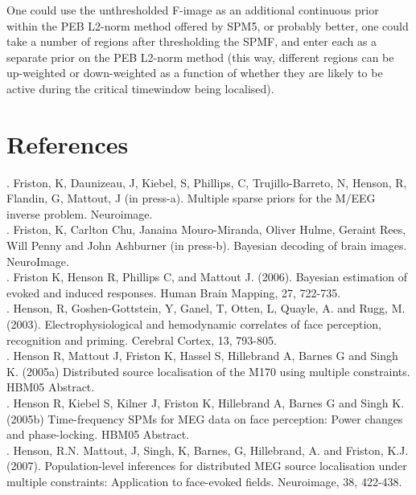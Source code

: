 One could use the unthresholded F-image as an additional continuous prior within the PEB L2-norm method offered by SPM5, or probably better, one could take a number of regions after thresholding the SPM{F}, and enter each as a separate prior on the PEB L2-norm method (this way, different regions can be up-weighted or down-weighted as a function of whether they are likely to be active during the critical timewindow being localised).



\section{References}

. Friston, K, Daunizeau, J, Kiebel, S, Phillips, C, Trujillo-Barreto, N, Henson, R, Flandin, G, Mattout, J (in press-a). Multiple sparse priors for the M/EEG inverse problem. Neuroimage. \\

. Friston, K, Carlton Chu, Janaina Mouro-Miranda, Oliver Hulme, Geraint Rees, Will Penny and John Ashburner (in press-b). Bayesian decoding of brain images. NeuroImage.\\

. Friston K, Henson R, Phillips C, and Mattout J. (2006). Bayesian estimation of evoked and induced responses. Human Brain Mapping, 27, 722-735.\\

. Henson, R, Goshen-Gottstein, Y, Ganel, T, Otten, L, Quayle, A. and Rugg, M. (2003). Electrophysiological and hemodynamic correlates of face perception, recognition and priming. Cerebral Cortex, 13, 793-805.\\

. Henson R, Mattout J, Friston K, Hassel S, Hillebrand A, Barnes G and Singh K. (2005a) Distributed source localisation of the M170 using multiple constraints. HBM05 Abstract.\\

. Henson R, Kiebel S, Kilner J, Friston K, Hillebrand A, Barnes G and Singh K. (2005b) Time-frequency SPMs for MEG data on face perception: Power changes and phase-locking. HBM05 Abstract.\\

. Henson, R.N. Mattout, J, Singh, K, Barnes, G, Hillebrand, A. and Friston, K.J. (2007). Population-level inferences for distributed MEG source localisation under multiple constraints: Application to face-evoked fields. Neuroimage, 38, 422-438.\\

